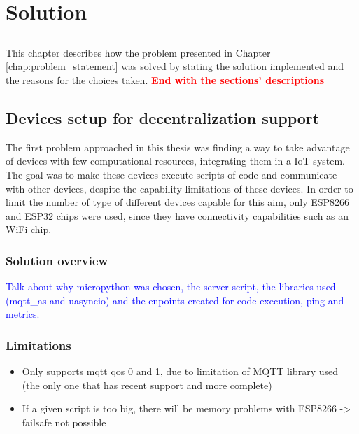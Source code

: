 \chapter{Solution} \label{chap:solution}

\section*{}

This chapter describes how the problem presented in Chapter \ref{chap:problem_statement} was solved by stating the solution implemented and the reasons for the choices taken.  \textbf{\textcolor{red}{End with the sections' descriptions}}

\section{Devices setup for decentralization support}\label{sec:devices_decentralization}

The first problem approached in this thesis was finding a way to take advantage of devices with few computational resources, integrating them in a IoT system. The goal was to make these devices execute scripts of code and communicate with other devices, despite the capability limitations of these devices. In order to limit the number of type of different devices capable for this aim, only ESP8266 and ESP32 chips were used, since they have connectivity capabilities such as an WiFi chip.

\subsection{Solution overview}


\textcolor{blue}{Talk about why micropython was chosen, the server script, the libraries used (mqtt\_as and uasyncio) and the enpoints created for code execution, ping and metrics.}

\subsection{Limitations}

\begin{itemize}
    \item Only supports mqtt qos 0 and 1, due to limitation of MQTT library used (the only one that has recent support and more complete)
    \item If a given script is too big, there will be memory problems with ESP8266 -> failsafe not possible
\end{itemize}


